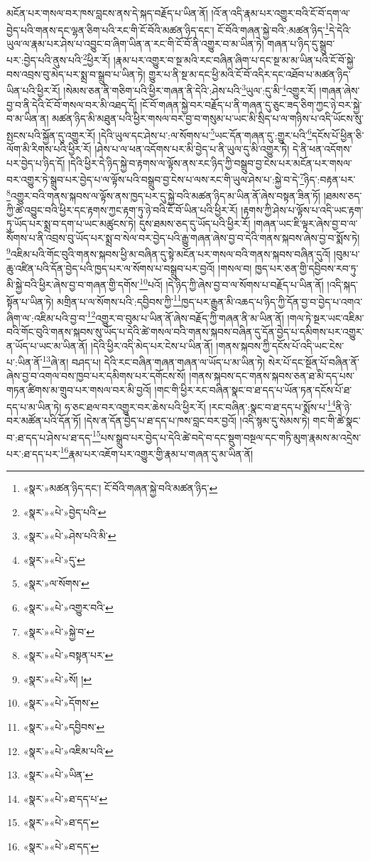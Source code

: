 མངོན་པར་གསལ་བར་ཁས་བླངས་ནས་དེ་སྐད་བརྗོད་པ་ཡིན་ནོ། །འོ་ན་འདི་རྣམ་པར་འགྱུར་བའི་ངོ་བོ་དག་ལ་བྱེད་པའི་གནས་དང་ལྷན་ཅིག་པའི་རང་གི་ངོ་བོའི་མཚན་ཉིད་དང་། ངོ་བོའི་གཞན་སྐྱེ་བའི་:མཚན་ཉིད་\footnote{«སྣར་»མཚན་ཉིད་དང་། ངོ་བོའི་གཞན་སྐྱེ་བའི་མཚན་ཉིད་}དེ་དེའི་ཡུལ་ལ་རྣམ་པར་ཤེས་པ་འབྱུང་བ་ཞིག་ཡིན་ན་རང་གི་ངོ་བོ་ནི་འགྱུར་བ་མ་ཡིན་ཏེ། གཞན་པ་ཉིད་དུ་སྒྲུབ་པར་:བྱེད་པའི་ནུས་པའི་\footnote{«སྣར་»«པེ་»བྱེད་པའི་}ཕྱིར་རོ། །རྣམ་པར་འགྱུར་བ་སྔ་མའི་རང་བཞིན་ཞིག་པ་དང་སྔ་མ་མ་ཡིན་པའི་ངོ་བོ་སྐྱེ་བས་འབྲས་བུ་མེད་པར་སྨྲ་བ་སྒྲུབ་པ་ཡིན་ཏེ། གྱུར་པ་ནི་སྔ་མ་དང་ཕྱི་མའི་ངོ་བོ་འདིར་དང་འཐོབ་པ་མཚན་ཉིད་ཡིན་པའི་ཕྱིར་རོ། །སེམས་ཅན་ནི་གཅིག་པའི་ཕྱིར་གཞན་ནི་དེའི་:ཤེས་པའི་\footnote{«སྣར་»«པེ་»ཤེས་པའི་མི་}ཡུལ་:དུ་མི་\footnote{«སྣར་»«པེ་»དུ་}འགྱུར་རོ། །གཞན་ཞེས་བྱ་བ་ནི་དེའི་ངོ་བོ་གསལ་བར་མི་འཐད་དོ། །ངོ་བོ་གཞན་སྐྱེ་བར་བརྗོད་པ་ནི་གཞན་དུ་ཅུང་ཟད་ཅིག་ཀྱང་ཉེ་བར་སྐྱེ་བ་མ་ཡིན་ན། མཚན་ཉིད་མི་མཐུན་པའི་ཕྱིར་གསལ་བར་བྱ་བ་གསུམ་པ་ཡང་མི་སྲིད་པ་ལ་གཉིས་པ་འདི་ཡོངས་སུ་སྤངས་པའི་སྐྱོན་དུ་འགྱུར་རོ། །དེའི་ཡུལ་དང་ཤེས་པ་:ལ་སོགས་པ་\footnote{«སྣར་»ལ་སོགས་}ཡང་དོན་གཞན་དུ་:གྱུར་པའི་\footnote{«སྣར་»«པེ་»འགྱུར་བའི་}དངོས་པོ་ཕྱིན་ཅི་ལོག་མི་རིགས་པའི་ཕྱིར་རོ། །ཤེས་པ་ལ་ཕན་འདོགས་པར་མི་བྱེད་པ་ནི་ཡུལ་དུ་མི་འགྱུར་ཏེ། དེ་ནི་ཕན་འདོགས་པར་བྱེད་པ་ཉིད་དོ། །དེའི་ཕྱིར་དེ་ཉིད་སྐྱེ་བ་རྟགས་ལ་ལྟོས་ནས་རང་ཉིད་ཀྱི་བསྒྲུབ་བྱ་ངེས་པར་མངོན་པར་གསལ་བར་འགྱུར་ཏེ་སྒྲུབ་པར་བྱེད་པ་ལ་ལྟོས་པའི་བསྒྲུབ་བྱ་ངེས་པ་ལས་རང་གི་ཡུལ་ཤེས་པ་:སྐྱེ་བ་དེ་\footnote{«སྣར་»«པེ་»སྐྱེ་བ་}ཉིད་:བརྟན་པར་\footnote{«སྣར་»«པེ་»བསྟན་པར་}འགྱུར་བའི་གནས་སྐབས་ལ་ལྟོས་ནས་ཁྱད་པར་དུ་སྐྱེ་བའི་མཚན་ཉིད་མ་ཡིན་ནོ་ཞེས་བསྟན་ཟིན་ཏོ། །ཐམས་ཅད་ཀྱི་ཚེ་འབྱུང་བའི་ཕྱིར་དང་རྟགས་ཀྱང་རྟག་ཏུ་ཉེ་བའི་ངོ་བོ་ཡིན་པའི་ཕྱིར་རོ། །རྟགས་ཀྱི་ཤེས་པ་ལྟོས་པ་འདི་ཡང་རྟག་ཏུ་ཡོད་པར་སྨྲ་བ་དག་པ་ཡང་མཚུངས་ཏེ། དུས་ཐམས་ཅད་དུ་ཡོད་པའི་ཕྱིར་རོ། །གཞན་ཡང་ཇི་ལྟར་ཞེས་བྱ་བ་ལ་སོགས་པ་ནི་འབྲས་བུ་ཡོད་པར་སྨྲ་བ་སེལ་བར་བྱེད་པའི་རྒྱུ་གཞན་ཞེས་བྱ་བ་དེའི་གནས་སྐབས་ཞེས་བྱ་བ་སྨོས་ཏེ། \footnote{«སྣར་»«པེ་»སོ། ། }འཇིམ་པའི་གོང་བུའི་གནས་སྐབས་ཕྱི་མ་བཞིན་དུ་སྟེ་མངོན་པར་གསལ་བའི་གནས་སྐབས་བཞིན་དུའོ། །བུམ་པ་ཆུ་འཛིན་པའི་དོན་བྱེད་པའི་ཁྱད་པར་ལ་སོགས་པ་བསྒྲུབ་པར་བྱའོ། །གསལ་བ། ཁྱད་པར་ཅན་གྱི་དབྱིབས་རབ་ཏུ་མི་སྐྱེ་བའི་ཕྱིར་ཞེས་བྱ་བ་གཞན་གྱི་དགོས་\footnote{«སྣར་»«པེ་»དོགས་}པའོ། །དེ་ཉིད་ཀྱི་ཞེས་བྱ་བ་ལ་སོགས་པ་བརྗོད་པ་ཡིན་ནོ། །འདི་སྐད་སྟོན་པ་ཡིན་ཏེ། མགྲིན་པ་ལ་སོགས་པའི་:དབྱིབས་ཀྱི་\footnote{«སྣར་»«པེ་»དབྱིབས་}ཁྱད་པར་རྒྱུན་མི་འཆད་པ་ཉིད་ཀྱི་དོན་བྱ་བ་བྱེད་པ་འགའ་ཞིག་ལ་:འཇིམ་པའི་བྱ་བ་\footnote{«སྣར་»«པེ་»འཇིམ་པའི་}འགྱུར་བ་བུམ་པ་ཡིན་ནོ་ཞེས་བརྗོད་ཀྱི་གཞན་ནི་མ་ཡིན་ནོ། །གལ་ཏེ་སྔར་ཡང་འཇིམ་བའི་གོང་བུའི་གནས་སྐབས་སུ་ཡོད་པ་དེའི་ཚེ་གསལ་བའི་གནས་སྐབས་བཞིན་དུ་དོན་བྱེད་པ་དམིགས་པར་འགྱུར་ན་ཡོད་པ་ཡང་མ་ཡིན་ནོ། །དེའི་ཕྱིར་འདི་མེད་པར་ངེས་པ་ཡིན་ནོ། །གནས་སྐབས་ཀྱི་དངོས་པོ་འདི་ཡང་ངེས་པ་:ཡིན་ནོ་\footnote{«སྣར་»«པེ་»ཡིན་}ཞེ་ན། བཤད་པ། དེའི་རང་བཞིན་གཞན་གཞན་ལ་ཡོད་པ་མ་ཡིན་ཏེ། སེར་པོ་དང་སྔོན་པོ་བཞིན་ནོ་ཞེས་བྱ་བ་འགལ་བས་ཁྱབ་པར་དམིགས་པར་དགོངས་སོ། །གནས་སྐབས་དང་གནས་སྐབས་ཅན་ཐ་མི་དད་པས་གཏན་ཚིགས་མ་གྲུབ་པར་གསལ་བར་མི་བྱའོ། །གང་གི་ཕྱིར་རང་བཞིན་སྣང་བ་ཐ་དད་པ་ཡོན་ཏན་དངོས་པོ་ཐ་དད་པ་མ་ཡིན་ཏེ། ཧ་ཅང་ཐལ་བར་འགྱུར་བར་ཆེས་པའི་ཕྱིར་རོ། །རང་བཞིན་:སྣང་བ་ཐ་དད་པ་སྨོས་པ་\footnote{«སྣར་»«པེ་»ཐ་དད་པ་}ནི་ཉེ་བར་མཚོན་པའི་དོན་ཏོ། །དེས་ན་དོན་བྱེད་པ་ཐ་དད་པ་ཁས་བླང་བར་བྱའོ། །འདི་སྙམ་དུ་སེམས་ཏེ། གང་གི་ཚེ་སྣང་བ་:ཐ་དད་པ་ཤེས་པ་ཐ་དད་\footnote{«སྣར་»«པེ་»ཐ་དད་}པས་སྒྲུབ་པར་བྱེད་པ་དེའི་ཚེ་བདེ་བ་དང་སྡུག་བསྔལ་དང་གཏི་མུག་རྣམས་མ་འདྲེས་པར་:ཐ་དད་པར་\footnote{«སྣར་»«པེ་»ཐ་དད་}རྣམ་པར་འཇོག་པར་འགྱུར་གྱི་རྣམ་པ་གཞན་དུ་མ་ཡིན་ནོ། 